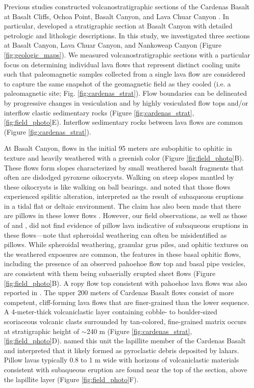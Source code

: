 Previous studies constructed volcanostratigraphic sections of the Cardenas Basalt at Basalt Cliffs, Ochoa Point, Basalt Canyon, and Lava Chuar Canyon \citep{Lucchitta1983a, Hendricks1989a}. In particular, \cite{Hendricks1989a} developed a stratigraphic section at Basalt Canyon with detailed petrologic and lithologic descriptions. In this study, we investigated three sections at Basalt Canyon, Lava Chuar Canyon, and Nankoweap Canyon (Figure \ref{fig:geologic_maps}). We measured volcanostratigraphic sections with a particular focus on determining individual lava flows that represent distinct cooling units such that paleomagnetic samples collected from a single lava flow are considered to capture the same snapshot of the geomagnetic field as they cooled (i.e. a paleomagnetic site; Fig. \ref{fig:cardenas_strat}). Flow boundaries can be delineated by progressive changes in vesiculation and by highly vesiculated flow tops and/or interflow clastic sedimentary rocks (Figure \ref{fig:cardenas_strat}, \ref{fig:field_photo}E). Interflow sedimentary rocks between lava flows are common (Figure \ref{fig:cardenas_strat}).

At Basalt Canyon, flows in the initial 95 meters are subophitic to ophitic in texture and heavily weathered with a greenish color (Figure \ref{fig:field_photo}B). These flows form slopes characterized by small weathered basalt fragments that often are dislodged pyroxene oikocrysts. Walking on steep slopes mantled by these oikocrysts is like walking on ball bearings. \cite{Walcott1883a} and \cite{Lucchitta1979a} noted that those flows experienced spilitic alteration, interpreted as the result of subaqueous eruptions in a tidal flat or deltaic environment. The claim has also been made that there are pillows in these lower flows \citep{Stevenson1982a, Hendricks1974a}. However, our field observations, as well as those of \cite{Larson1994a} and \cite{Elston1976a}, did not find evidence of pillow lava indicative of subaqueous eruptions in these flows---note that spheroidal weathering can often be misidentified as pillows. While spheroidal weathering, granular grus piles, and ophitic textures on the weathered exposures are common, the features in these basal ophitic flows, including the presence of an observed pahoehoe flow top and basal pipe vesicles, are consistent with them being subaerially erupted sheet flows (Figure \ref{fig:field_photo}B). A ropy flow top consistent with pahoehoe lava flows was also reported in \cite{Hendricks1989a}. The upper 200 meters of Cardenas Basalt flows consist of more competent, cliff-forming lava flows that are finer-grained than the lower sequence. A 4-meter-thick volcaniclastic layer containing cobble- to boulder-sized scoriaceous volcanic clasts surrounded by tan-colored, fine-grained matrix occurs at stratigraphic height of $\sim$240 m (Figure \ref{fig:cardenas_strat}, \ref{fig:field_photo}D). \cite{Lucchitta1983a} named this unit the lapillite member of the Cardenas Basalt and interpreted that it likely formed as pyroclastic debris deposited by lahars. Pillow lavas typically 0.8 to 1 m wide with horizons of volcaniclastic materials consistent with subaqueous eruption are found near the top of the section, above the lapillite layer (Figure \ref{fig:field_photo}F). 

